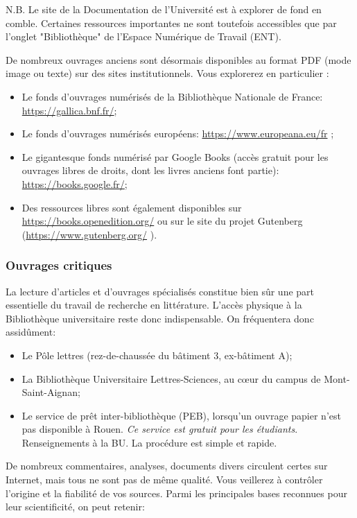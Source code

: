 \documentclass[12pt,twoside,final,openright]{book}
\begin{document}
N.B. Le site de la Documentation de l’Université est à explorer de fond en comble. Certaines ressources importantes ne sont toutefois accessibles que par l’onglet "Bibliothèque" de l’Espace Numérique de Travail (ENT).

\medskip
De nombreux ouvrages anciens sont désormais disponibles au format PDF (mode image ou texte) sur des sites institutionnels. Vous explorerez en particulier : 

\begin{itemize}
	\item Le fonds d'ouvrages numérisés de la Bibliothèque Nationale de France: \url{https://gallica.bnf.fr/};
	\item Le fonds d'ouvrages numérisés européens: \url{https://www.europeana.eu/fr} ;
	\item Le gigantesque fonds numérisé par Google Books (accès gratuit pour les ouvrages libres de droits, dont les livres anciens font partie): \url{https://books.google.fr/};
	\item Des ressources libres sont également disponibles sur \url{https://books.openedition.org/} ou sur le site du projet Gutenberg (\url{https://www.gutenberg.org/} ).
\end{itemize}

\subsubsection {Ouvrages critiques}
La lecture d’articles et d’ouvrages spécialisés constitue bien sûr une part essentielle du travail de recherche en littérature. L’accès physique à la Bibliothèque universitaire reste donc indispensable. On fréquentera donc assidûment: 

\begin{itemize}
	\item 	Le Pôle lettres (rez-de-chaussée du bâtiment 3, ex-bâtiment A);
	\item La Bibliothèque Universitaire Lettres-Sciences, au cœur du campus de Mont-Saint-Aignan;
	\item Le service de prêt inter-bibliothèque (PEB), lorsqu'un ouvrage papier n'est pas disponible à Rouen. \textit{Ce service est gratuit pour les étudiants}. Renseignements à la BU. La procédure est simple et rapide.
\end{itemize}

De nombreux commentaires, analyses, documents divers circulent certes
sur Internet, mais tous ne sont pas de même qualité. Vous veillerez à
contrôler l'origine et la fiabilité de vos sources. Parmi les
principales bases reconnues pour leur scientificité, on peut retenir:
\end{document}
